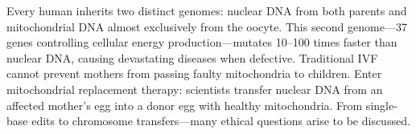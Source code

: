 Every human inherits two distinct genomes: nuclear DNA from both parents and mitochondrial DNA almost exclusively from the oocyte. This second genome—37 genes controlling cellular energy production—mutates 10–100 times faster than nuclear DNA, causing devastating diseases when defective. Traditional IVF cannot prevent mothers from passing faulty mitochondria to children. Enter mitochondrial replacement therapy: scientists transfer nuclear DNA from an affected mother's egg into a donor egg with healthy mitochondria. From single-base edits to chromosome transfers—many ethical questions arise to be discussed.